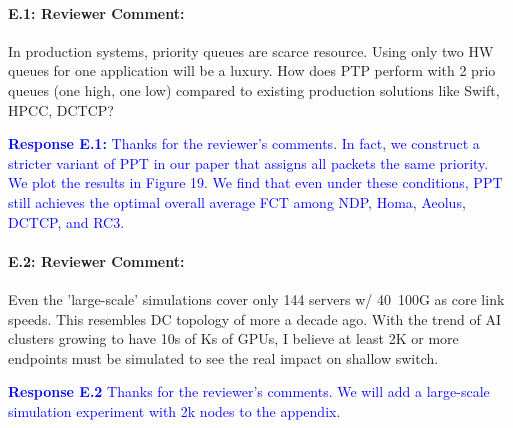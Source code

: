 \documentclass[12pt,one-column]{article}
\begin{document}
{\it \paragraph{E.1: Reviewer Comment:} In production systems, priority queues are scarce resource. Using only two HW queues for one application will be a luxury. How does PTP perform with 2 prio queues (one high, one low) compared to existing production solutions like Swift, HPCC, DCTCP?}

\noindent\textcolor{blue}{\textbf{Response E.1:}
Thanks for the reviewer’s comments. 
In fact, we construct a stricter variant of PPT in our paper that assigns all packets the same priority.
We plot the results in Figure 19.
We find that even under these conditions, PPT still achieves the optimal overall average FCT among NDP, Homa, Aeolus, DCTCP, and RC3.
}

{\it \paragraph{E.2: Reviewer Comment:} Even the 'large-scale' simulations cover only 144 servers w/ 40~100G as core link speeds. This resembles DC topology of more a decade ago. With the trend of AI clusters growing to have 10s of Ks of GPUs, I believe at least 2K or more endpoints must be simulated to see the real impact on shallow switch.}

\noindent\textcolor{blue}{\textbf{Response E.2}
Thanks for the reviewer’s comments. 
We will add a large-scale simulation experiment with 2k nodes to the appendix.
} 

\begin{spacing}{-1.0}

\vspace{-0.1in}

\end{spacing}
\end{document}
